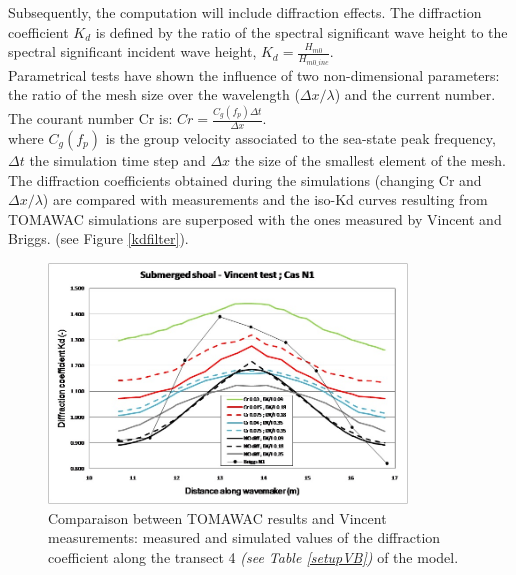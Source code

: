 Subsequently, the computation will include diffraction effects.
The diffraction coefficient $K_d$ is defined by the ratio of the spectral significant wave height to the spectral significant incident wave height, $K_d = \frac{H_{m0}}{H_{m0\_ inc}}$.\\
Parametrical tests have shown the influence of two non-dimensional parameters: the ratio of the mesh size over the wavelength ($\Delta x / \lambda$) and the current number.
The courant number Cr is: $Cr = \frac{C_g(f_p)\Delta t}{\Delta x}$.\\
where $C_g(f_p)$ is the group velocity associated to the sea-state peak frequency, $\Delta t$ the simulation time step and $\Delta x$ the size of the smallest element of the mesh.\\
The diffraction coefficients obtained during the simulations (changing Cr and $\Delta x / \lambda $) are compared with measurements \cite{Vincent1989} and the iso-Kd curves resulting from TOMAWAC simulations are superposed with the ones measured by Vincent and Briggs. (see Figure \ref{kdfilter}).


\begin{figure}[!h]
  \centering
    \includegraphics[width=0.85\textwidth]{Kd.jpg}
      \caption{Comparaison between TOMAWAC results and Vincent measurements: measured and simulated values of the diffraction coefficient along the transect 4 \textit{(see Table \ref{setupVB})} of the model.}
\label{kd4}
\end{figure}

